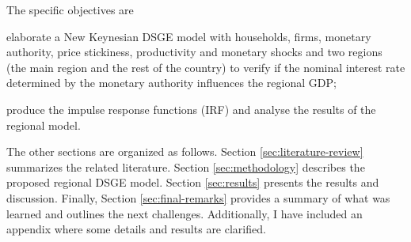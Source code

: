 \documentclass[../thesis.tex]{subfiles}
\begin{document}
The specific objectives are
\begin{enumerate*}[label=(\arabic*)]
	\item elaborate a New Keynesian DSGE model with households, firms, monetary authority, price stickiness, productivity and monetary shocks and two regions (the main region and the rest of the country) to verify if the nominal interest rate determined by the monetary authority influences the regional GDP;
	\item produce the impulse response functions (IRF) and analyse the results of the regional model.
\end{enumerate*}


The other sections are organized as follows. Section \eqref{sec:literature-review} summarizes the related literature. Section \eqref{sec:methodology} describes the proposed regional DSGE model. Section \eqref{sec:results} presents the results and discussion. Finally, Section \eqref{sec:final-remarks} provides a summary of what was learned and outlines the next challenges. Additionally, I have included an appendix where some details and results are clarified.
\end{document}
